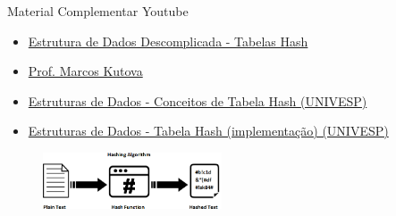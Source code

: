 \documentclass[aspectratio=169]{beamer}
\begin{document}
\begin{frame}{Material Complementar}
Youtube
\begin{itemize}
  \item \href{https://www.youtube.com/watch?v=njkANXEMHTY}{Estrutura de Dados Descomplicada - Tabelas Hash}   
  \item \href{https://www.youtube.com/watch?v=M4DGQPF2Oxo}{Prof. Marcos Kutova}   
  \item \href{https://www.youtube.com/watch?v=jQ0r7P8rC1M}{Estruturas de Dados - Conceitos de Tabela Hash (UNIVESP)}    
  \item \href{https://www.youtube.com/watch?v=RmO18m_8ncc}{Estruturas de Dados - Tabela Hash (implementação) (UNIVESP)}      
\end{itemize}	
\end{frame}   

\begin{frame}
\titlepage %

\begin{figure}[!h]
  \centering
  \includegraphics[width=150pt]{imagens/introducao.png}
  \label{fig_introducao}
\end{figure}
\end{frame}
\end{document}
